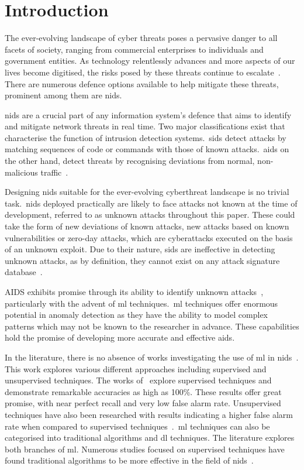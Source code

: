 \chapter{Introduction}%
\label{chp:introduction}


The ever-evolving landscape of cyber threats poses a pervasive danger to all
facets of society, ranging from commercial enterprises to individuals and
government entities. As technology relentlessly advances and more aspects of
our lives become digitised, the risks posed by these threats continue to
escalate~\cite{ENISA}. There are numerous defence options available to help
mitigate these threats, prominent among them are \gls{nids}.

\gls{nids} are a crucial part of any information system's defence that aims to
identify and mitigate network threats in real time. Two major classifications
exist that characterise the function of intrusion detection systems.\ \gls{sids}
detect attacks by matching sequences of code or commands with those of known
attacks.\ \gls{aids} on the other hand, detect threats by recognising
deviations from normal, non-malicious traffic~\cite{survey1}.

Designing \gls{nids} suitable for the ever-evolving cyberthreat landscape is no
trivial task.\ \gls{nids} deployed practically are likely to face attacks not
known at the time of development, referred to as unknown attacks throughout
this paper. These could take the form of new deviations of known attacks, new
attacks based on known vulnerabilities or zero-day attacks, which are
cyberattacks executed on the basis of an unknown exploit. Due to their nature,
\gls{sids} are ineffective in detecting unknown attacks, as by definition, they
cannot exist on any attack signature database~\cite{survey1}.

AIDS exhibits promise through its ability to identify unknown
attacks~\cite{aids-unknown}, particularly with the advent of \gls{ml}
techniques.\ \gls{ml} techniques offer enormous potential in anomaly detection
as they have the ability to model complex patterns which may not be known to
the researcher in advance. These capabilities hold the promise of developing
more accurate and effective \gls{aids}.

In the literature, there is no absence of works investigating the use of
\gls{ml} in \gls{nids}~\cite{Karatas, Jiang, Mighan, Pu, Cao, Atefinia}. This
work explores various different approaches including supervised and
unsupervised techniques. The works of~\cite{Karatas, Jiang, Mighan, Atefinia}
explore supervised techniques and demonstrate remarkable accuracies as high as
100\%. These results offer great promise, with near perfect recall and very low
false alarm rate. Unsupervised techniques have also been researched with
results indicating a higher false alarm rate when compared to supervised
techniques~\cite{Zoppi}.\ \gls{ml} techniques can also be categorised into
traditional algorithms and \gls{dl} techniques. The literature explores both
branches of \gls{ml}. Numerous studies focused on supervised techniques have
found traditional algorithms to be more effective in the field of
\gls{nids}~\cite{Liu, Zoppi}.

